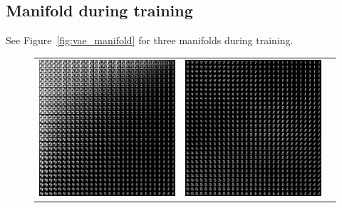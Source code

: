 \documentclass{article}
\begin{document}
\subsection{Manifold during training}
See Figure~\ref{fig:vae_manifold} for three manifolds during training.

\begin{figure}
  \centering
  \begin{tabularx}{\linewidth}{XXX}
    \includegraphics[width=\linewidth]{assignment_3/code/figures/vae_manifold_0.png} &
    \includegraphics[width=\linewidth]{assignment_3/code/figures/vae_manifold_20.png} &

\end{tabularx}
\end{figure}
\end{document}
